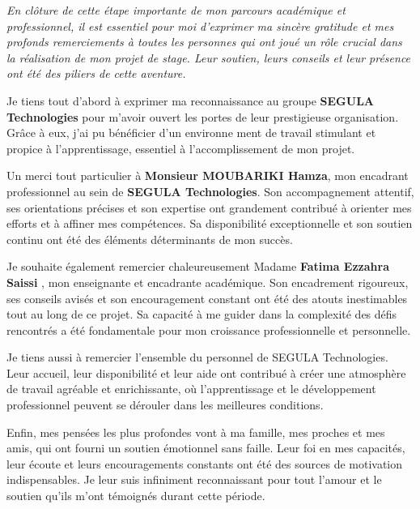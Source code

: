 




{\itshape En clôture de cette étape importante de mon parcours académique et professionnel, il est essentiel pour
moi d’exprimer ma sincère gratitude et mes profonds remerciements à toutes les personnes qui ont joué un
rôle crucial dans la réalisation de mon projet de stage. Leur soutien, leurs conseils et leur présence ont été
des piliers de cette aventure.
\par\bigskip

Je tiens tout d’abord à exprimer ma reconnaissance au groupe \textbf{SEGULA Technologies} pour
m’avoir ouvert les portes de leur prestigieuse organisation. Grâce à eux, j’ai pu bénéficier d’un environne
ment de travail stimulant et propice à l’apprentissage, essentiel à l’accomplissement de mon projet.
\par\bigskip

Un merci tout particulier à \textbf{Monsieur MOUBARIKI Hamza}, mon encadrant  professionnel au sein
de \textbf{SEGULA Technologies}. Son accompagnement attentif, ses orientations précises et son expertise
ont grandement contribué à orienter mes efforts et à affiner mes compétences. Sa disponibilité exceptionnelle
et son soutien continu ont été des éléments déterminants de mon succès.
\par\bigskip

Je souhaite également remercier chaleureusement Madame \textbf{Fatima Ezzahra Saissi }, mon enseignante
et encadrante académique. Son encadrement rigoureux, ses conseils avisés et son encouragement constant ont
été des atouts inestimables tout au long de ce projet. Sa capacité à me guider dans la complexité des défis
rencontrés a été fondamentale pour mon croissance professionnelle et personnelle.
\par\bigskip

Je tiens aussi à remercier l’ensemble du personnel de SEGULA Technologies. Leur accueil, leur
disponibilité et leur aide ont contribué à créer une atmosphère de travail agréable et enrichissante, où l’apprentissage et le développement professionnel peuvent se dérouler dans les meilleures conditions.
\par\bigskip

Enfin, mes pensées les plus profondes vont à ma famille, mes proches et mes amis, qui ont fourni un
soutien émotionnel sans faille. Leur foi en mes capacités, leur écoute et leurs encouragements constants ont
été des sources de motivation indispensables. Je leur suis infiniment reconnaissant pour tout l’amour et le
soutien qu’ils m’ont témoignés durant cette période.

\par\bigskip
}


